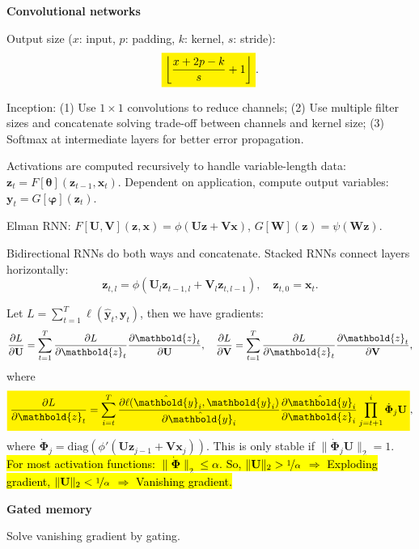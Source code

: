 \documentclass[10pt]{article}
\newenvironment{topic}[1]
{\textbf{\sffamily \footnotesize \colorbox{black}{\rlap{\textbf{\textcolor{white}{#1}}}\hspace{\linewidth}\hspace{-2\fboxsep}}}}
{}
\newenvironment{subtopic}[1]
{\begin{center}\textbf{\footnotesize \sffamily #1}\end{center}}
{}
\renewcommand{\mat}[1]{\ensuremath{\mathbf{#1}}}
\renewcommand{\vec}[1]{\ensuremath{\mathbold{#1}}}
\begin{document}
\begin{multicols*}{3}
\begin{topic}{Convolutional networks}
\begin{subtopic}{Convolutional networks}
            Output size ($x$: input, $p$: padding, $k$: kernel, $s$: stride): \[
                \colorbox{yellow}{$\displaystyle \lft\lfloor \frac{x+2p-k}{s} + 1 \rgt\rfloor$}.
            \]

            Inception: (1) Use $1 \times 1$ convolutions to reduce channels; (2) Use multiple filter
            sizes and concatenate solving trade-off between channels and kernel size; (3) Softmax at
            intermediate layers for better error propagation.
            
        \end{subtopic}

    \end{topic}

    \begin{topic}{Recurrent neural networks}
        Activations are computed recursively to handle variable-length data: $\vec{z}_t = F[\vec{\theta}](\vec{z}_{t-1},\vec{x}_t)$.
        Dependent on application, compute output variables: $\vec{y}_t = G[\vec{\varphi}](\vec{z}_t)$.

        Elman RNN: $F[\mat{U},\mat{V}](\vec{z},\vec{x}) = \phi(\mat{U}\vec{z} + \mat{V}\vec{x})$, $G[\mat{W}](\vec{z}) = \psi(\mat{W}\vec{z})$.

        Bidirectional RNNs do both ways and concatenate. Stacked RNNs connect layers horizontally: \[
            \vec{z}_{t,l} = \phi(\mat{U}_l \vec{z}_{t-1,l} + \mat{V}_l \vec{z}_{t,l-1}), \quad \vec{z}_{t,0} = \vec{x}_t.
        \]

        Let $L = \sum_{t=1}^{T} \ell(\hat{\vec{y}}_t, \vec{y}_t)$, then we have gradients: \[
            \pdv{L}{\mat{U}} = \sum_{t=1}^{T} \pdv{L}{\vec{z}_t} \pdv{\vec{z}_t}{\mat{U}}, \quad \pdv{L}{\mat{V}} = \sum_{t=1}^{T} \pdv{L}{\vec{z}_t} \pdv{\vec{z}_t}{\mat{V}},
        \]
        where \[
            \colorbox{yellow}{$\displaystyle \pdv{L}{\vec{z}_t} = \sum_{i=t}^{T} \pdv{\ell(\hat{\vec{y}}_i, \vec{y}_i)}{\hat{\vec{y}}_i} \pdv{\hat{\vec{y}}_i}{\vec{z}_i} \prod_{j=t+1}^i \dot{\mat{\Phi}}_j \mat{U}$},
        \]
        where $\dot{\mat{\Phi}}_j = \mathrm{diag}(\phi'(\mat{U}\vec{z}_{j-1} + \mat{V}\vec{x}_j))$. This is only
        stable if $\| \dot{\mat{\Phi}}_j \mat{U} \|_2 = 1$. \hl{For most activation functions: $\| \dot{\mat{\Phi}} \|_2 \leq
            \alpha$. So, $\| \mat{U} \|_2 > \nicefrac{1}{\alpha}$ $\Rightarrow$ Exploding gradient,
        $\| \mat{U} \|_2 < \nicefrac{1}{\alpha}$ $\Rightarrow$ Vanishing gradient.}

        \begin{subtopic}{Gated memory}
            Solve vanishing gradient by gating.


\end{subtopic}
\end{topic}
\end{multicols*}
\end{document}
